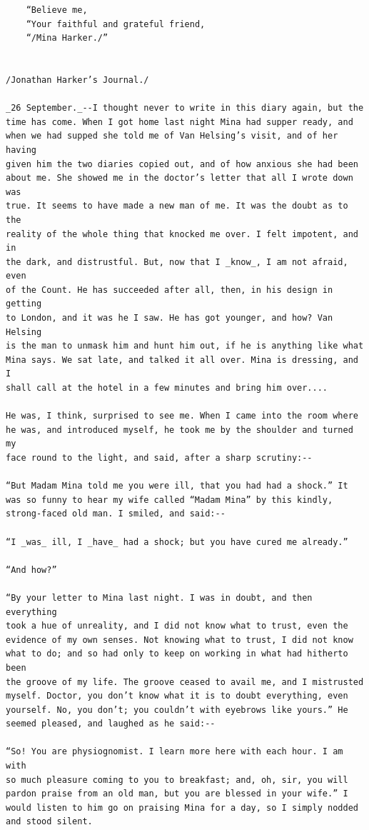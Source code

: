 \documentclass{article}
\begin{document}
\begin{verbatim}
    “Believe me,
    “Your faithful and grateful friend,
    “/Mina Harker./”


/Jonathan Harker’s Journal./

_26 September._--I thought never to write in this diary again, but the
time has come. When I got home last night Mina had supper ready, and
when we had supped she told me of Van Helsing’s visit, and of her having
given him the two diaries copied out, and of how anxious she had been
about me. She showed me in the doctor’s letter that all I wrote down was
true. It seems to have made a new man of me. It was the doubt as to the
reality of the whole thing that knocked me over. I felt impotent, and in
the dark, and distrustful. But, now that I _know_, I am not afraid, even
of the Count. He has succeeded after all, then, in his design in getting
to London, and it was he I saw. He has got younger, and how? Van Helsing
is the man to unmask him and hunt him out, if he is anything like what
Mina says. We sat late, and talked it all over. Mina is dressing, and I
shall call at the hotel in a few minutes and bring him over....

He was, I think, surprised to see me. When I came into the room where
he was, and introduced myself, he took me by the shoulder and turned my
face round to the light, and said, after a sharp scrutiny:--

“But Madam Mina told me you were ill, that you had had a shock.” It
was so funny to hear my wife called “Madam Mina” by this kindly,
strong-faced old man. I smiled, and said:--

“I _was_ ill, I _have_ had a shock; but you have cured me already.”

“And how?”

“By your letter to Mina last night. I was in doubt, and then everything
took a hue of unreality, and I did not know what to trust, even the
evidence of my own senses. Not knowing what to trust, I did not know
what to do; and so had only to keep on working in what had hitherto been
the groove of my life. The groove ceased to avail me, and I mistrusted
myself. Doctor, you don’t know what it is to doubt everything, even
yourself. No, you don’t; you couldn’t with eyebrows like yours.” He
seemed pleased, and laughed as he said:--

“So! You are physiognomist. I learn more here with each hour. I am with
so much pleasure coming to you to breakfast; and, oh, sir, you will
pardon praise from an old man, but you are blessed in your wife.” I
would listen to him go on praising Mina for a day, so I simply nodded
and stood silent.


\end{verbatim}
\end{document}
